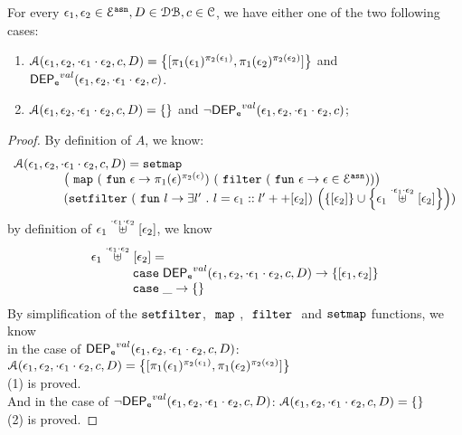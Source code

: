 %
\begin{lem}
\label{lem:inv_alg2}
For every $\mathtt{\epsilon}_1, \mathtt{\epsilon}_2 \in \mathcal{E}^{\mathtt{{asn}}}, D \in \mathcal{DB} , c \in \mathcal{C}$, we have either one of the two following cases:
\begin{enumerate}
  \item $\mathcal{A}(\event_1, \event_2, \cdot \event_1 \cdot \event_2, c, D) = 
  \left\{[\pi_1(\event_1)^{\pi_2(\event_1)}, \pi_1(\event_2)^{\pi_2(\event_2)}] \right \}$ 
  and $\mathsf{DEP_{\mathtt{e}}}^{val}(\mathtt{\epsilon}_1, \mathtt{\epsilon}_2, \cdot \mathtt{\epsilon}_1 \cdot \mathtt{\epsilon}_2, c)$.
  \item  $\mathcal{A}(\mathtt{\epsilon}_1, \mathtt{\epsilon}_2, \cdot \mathtt{\epsilon}_1 \cdot \mathtt{\epsilon}_2, c, D) = \{\}$ 
  and $\neg \mathsf{DEP_{\mathtt{e}}}^{val}(\mathtt{\epsilon}_1, \mathtt{\epsilon}_2, \cdot \mathtt{\epsilon}_1 \cdot \mathtt{\epsilon}_2, c)$;
\end{enumerate}
\end{lem}
\begin{proof}
By definition of $A$, we know:
%
\[
	\begin{array}{l}
	\mathcal{A}(\event_1, \event_2, \cdot \event_1 \cdot \event_2, c, D)
	= 
	\kw{setmap} ~
	\\ \qquad \qquad
	\left(\emap 
		(\efun  \event \to \pi_1(\event)^{\pi_2(\event)})	
	~
	(\efilter 
		(\efun \event \to  \event \in \eventset^{\asn})) \right)
	\\ \qquad \qquad
	(\kw{setfilter} ~
		(\efun l \to \exists l' \st l = \event_1 :: l' ++ [\event_2]) ~ 
		\left(\left\{[\event_2]\right\} \cup \left\{ \event_1 \stackrel{\cdot \event_1 \cdot \event_2}{\uplus} [\event_2] \right\} \right))
	\end{array}
\]
by definition of $ \mathtt{\epsilon}_1 \stackrel{\cdot \mathtt{\epsilon}_1 \cdot \mathtt{\epsilon}_2}{\uplus} [\mathtt{\epsilon}_2] $, we know 
\[
	\begin{array}{l}
	\event_1 \stackrel{\cdot \event_1 \cdot \event_2}{\uplus} [\event_2]
	=   
	\\ \quad \qquad 	
	\ecase \eventdep^{val}(\event_1, \event_2, \cdot \event_1 \cdot \event_2, c, D)
	\to \left\{ [\event_1, \event_2] \right\}
	\\ \quad \qquad 	
	\ecase \_
	\to \left\{ \right\}
\end{array}
\]
%
By simplification of the $\mathtt{setfilter}$, $~\mathtt{map}~$, $~\mathtt{filter}~$ and $\mathtt{setmap}$ functions, we know
\\
in the case of $\mathsf{DEP_{\mathtt{e}}}^{val}(\mathtt{\epsilon}_1, \mathtt{\epsilon}_2, \cdot \mathtt{\epsilon}_1 \cdot \mathtt{\epsilon}_2, c, D)$:
$\mathcal{A}(\event_1, \event_2, \cdot \event_1 \cdot \event_2, c, D) = 
  \left\{[\pi_1(\event_1)^{\pi_2(\event_1)}, \pi_1(\event_2)^{\pi_2(\event_2)}] \right \}$
\\
(1) is proved.
\\
And in the case of $\neg \mathsf{DEP_{\mathtt{e}}}^{val}(\mathtt{\epsilon}_1, \mathtt{\epsilon}_2, \cdot \mathtt{\epsilon}_1 \cdot \mathtt{\epsilon}_2, c, D)$: 
$\mathcal{A}(\event_1, \event_2, \cdot  \event_1 \cdot \event_2, c, D) = 
  \left\{ \right \}$
\\
(2) is proved.
\end{proof}
%
%
%

